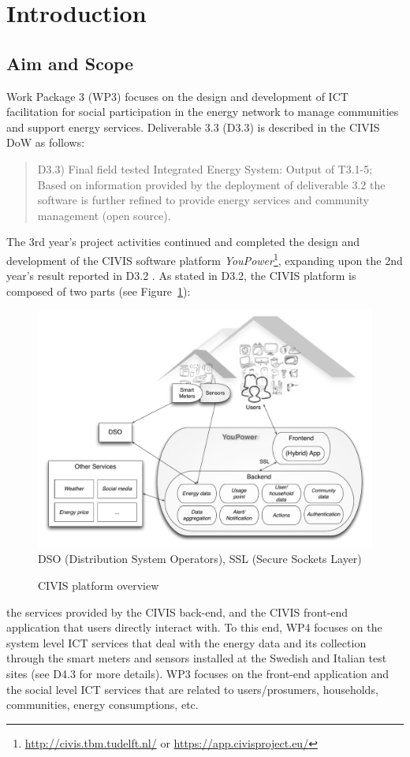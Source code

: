 
\section{Introduction}

\subsection{Aim and Scope} 

Work Package 3 (WP3) focuses on the design and development of ICT facilitation for social participation in the energy network to manage communities and support energy services. Deliverable 3.3 (D3.3) is described in the CIVIS DoW as follows: 

\begin{quote}
D3.3) Final field tested Integrated Energy System: Output of T3.1-5; Based on information provided by the deployment of deliverable 3.2 the software is further refined to provide energy services and community management (open source). 
\end{quote}


The 3rd year's project activities continued and completed  the design and development of the CIVIS software platform \textit{YouPower}\footnote{\url{http://civis.tbm.tudelft.nl/} or \url{https://app.civisproject.eu/}}, 
expanding upon the 2nd year's result reported in D3.2 \citep{Huang2015c}. 
%
As stated in D3.2, the CIVIS platform is composed of two parts (see Figure~\ref{fig:platform}): 
% 
\begin{figure}[h!]
\begin{center}\footnotesize
	\includegraphics[width=.85\textwidth]{img/civis_platform_overview.pdf}\\
	DSO (Distribution System Operators),  SSL (Secure Sockets Layer)
	\caption{CIVIS platform overview}\label{fig:platform}
\end{center}
\end{figure}
% 
the services provided by the CIVIS back-end, and the CIVIS front-end application that users directly interact with. 
%
To this end, WP4 focuses on the system level ICT services that deal with the energy data and its collection through the smart meters and sensors installed at the Swedish and Italian test sites (see D4.3 for more details). 
% 
WP3 focuses on the front-end application and the social level ICT services that are related to users/prosumers, households, communities, energy consumptions, etc. 

